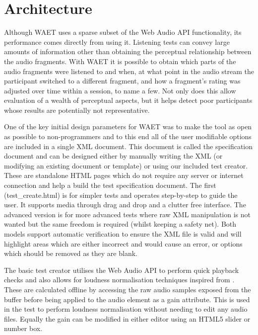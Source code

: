 \documentclass{sig-alternate}
\begin{document}
\section{Architecture}  %
\label{sec:architecture}

    Although WAET uses a sparse subset of the Web Audio API functionality, its performance comes directly from using it. Listening tests can convey large amounts of information other than obtaining the perceptual relationship between the audio fragments. With WAET it is possible to obtain which parts of the audio fragments were listened to and when, at what point in the audio stream the participant switched to a different fragment, and how a fragment's rating was adjusted over time within a session, to name a few. Not only does this allow evaluation of a wealth of perceptual aspects, but it helps detect poor participants whose results are potentially not representative.
    
    One of the key initial design parameters for WAET was to make the tool as open as possible to non-programmers and to this end all of the user modifiable options are included in a single XML document. This document is called the specification document and can be designed either by manually writing the XML (or modifying an existing document or template) or using our included test creator. These are standalone HTML pages which do not require any server or internet connection and help a build the test specification document. The first (test\_create.html) is for simpler tests and operates step-by-step to guide the user. It supports media through drag and drop and a clutter free interface. The advanced version is for more advanced tests where raw XML manipulation is not wanted but the same freedom is required (whilst keeping a safety net). Both models support automatic verification to ensure the XML file is valid and will highlight areas which are either incorrect and would cause an error, or options which should be removed as they are blank.
    
    The basic test creator utilises the Web Audio API to perform quick playback checks and also allows for loudness normalisation techniques inspired from \cite{ape}. These are calculated offline by accessing the raw audio samples exposed from the buffer before being applied to the audio element as a gain attribute. This is used in the test to perform loudness normalisation without needing to edit any audio files. Equally the gain can be modified in either editor using an HTML5 slider or number box.
    
\end{document}
